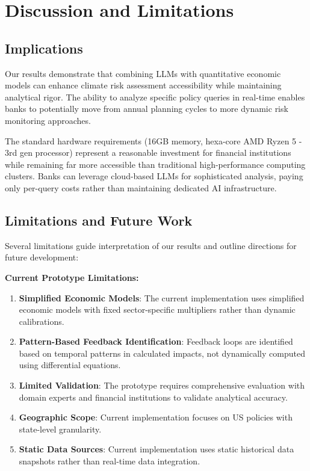 \documentclass[conference]{IEEEtran}
\begin{document}
\section{Discussion and Limitations}

\subsection{Implications}

Our results demonstrate that combining LLMs with quantitative economic models can enhance climate risk assessment accessibility while maintaining analytical rigor. The ability to analyze specific policy queries in real-time enables banks to potentially move from annual planning cycles to more dynamic risk monitoring approaches.

The standard hardware requirements (16GB memory, hexa-core AMD Ryzen 5 - 3rd gen processor) represent a reasonable investment for financial institutions while remaining far more accessible than traditional high-performance computing clusters. Banks can leverage cloud-based LLMs for sophisticated analysis, paying only per-query costs rather than maintaining dedicated AI infrastructure.

\subsection{Limitations and Future Work}

Several limitations guide interpretation of our results and outline directions for future development:

\textbf{Current Prototype Limitations:}
\begin{enumerate}
\item \textbf{Simplified Economic Models}: The current implementation uses simplified economic models with fixed sector-specific multipliers rather than dynamic calibrations.
\item \textbf{Pattern-Based Feedback Identification}: Feedback loops are identified based on temporal patterns in calculated impacts, not dynamically computed using differential equations.
\item \textbf{Limited Validation}: The prototype requires comprehensive evaluation with domain experts and financial institutions to validate analytical accuracy.
\item \textbf{Geographic Scope}: Current implementation focuses on US policies with state-level granularity.
\item \textbf{Static Data Sources}: Current implementation uses static historical data snapshots rather than real-time data integration.
\end{enumerate}
\end{document}
